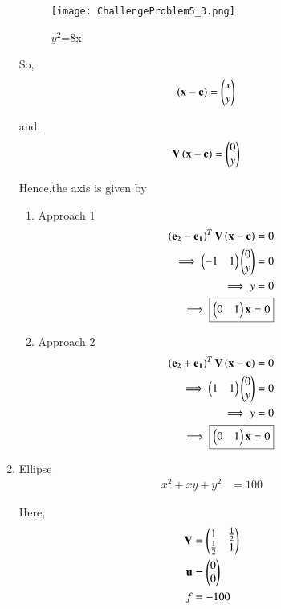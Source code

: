 \documentclass[journal,12pt,twocolumn]{IEEEtran}
\begin{document}
\begin{enumerate}
    \begin{figure}[!ht]
    \centering
    \texttt{[image: ChallengeProblem5\_3.png]}
    \caption{$y^2$=8x}
    \label{ex3}	
    \end{figure}
    
    So,
    \begin{align}
    \left(\mathbf{x}-\mathbf{c}\right) &= \begin{pmatrix}x \\ y\end{pmatrix}
    \end{align}

    and,
    \begin{align}
    \mathbf{V}\left(\mathbf{x}-\mathbf{c}\right) &= \begin{pmatrix}0 \\ y\end{pmatrix}
    \end{align}
    
    Hence,the axis is given by
    \begin{enumerate}
    \item Approach 1
    \begin{align}
    \left(\mathbf{e_2} - \mathbf{e_1}\right)^T\mathbf{V}\left(\mathbf{x}-\mathbf{c}\right) = 0\\
    \implies \begin{pmatrix}-1 & 1\end{pmatrix}\begin{pmatrix}0 \\ y\end{pmatrix} = 0 \\
    \implies y = 0  \\
    \implies \boxed{\begin{pmatrix}0 & 1\end{pmatrix}\mathbf{x} = 0}
    \end{align}
    
    \item Approach 2
    \begin{align}
    \left(\mathbf{e_2} + \mathbf{e_1}\right)^T\mathbf{V}\left(\mathbf{x}-\mathbf{c}\right) = 0\\
    \implies \begin{pmatrix}1 & 1\end{pmatrix}\begin{pmatrix}0 \\ y\end{pmatrix} = 0 \\
    \implies y = 0  \\
    \implies \boxed{\begin{pmatrix}0 & 1\end{pmatrix}\mathbf{x} = 0} 
    \end{align}
    \end{enumerate}
    
    \item Ellipse
    \begin{align}
        x^2+xy+y^2 &= 100
    \end{align}
    
    Here,
    \begin{align}
    \mathbf{V} &= \begin{pmatrix}1 & \frac{1}{2} \\ \frac{1}{2} & 1\end{pmatrix} \\
    \mathbf{u} &= \begin{pmatrix}0 \\ 0\end{pmatrix} \\
    f &= -100
    \end{align}


\end{enumerate}
\end{document}
